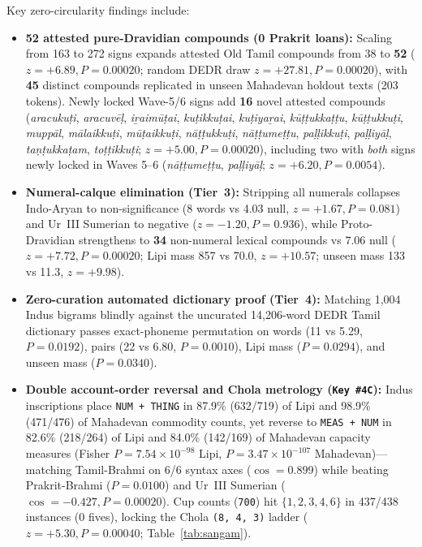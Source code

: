 \documentclass[11pt,a4paper]{article}
\begin{document}
Key zero-circularity findings include:
\begin{itemize}
  \item \textbf{52 attested pure-Dravidian compounds (0 Prakrit loans):} Scaling from 163 to 272 signs expands attested Old Tamil compounds from 38 to \textbf{52} ($z = +6.89, P = 0.00020$; random DEDR draw $z = +27.81, P = 0.00020$), with \textbf{45} distinct compounds replicated in unseen Mahadevan holdout texts (203 tokens). Newly locked Wave-5/6 signs add \textbf{16} novel attested compounds (\textit{aracukuṭi}, \textit{aracuvēḷ}, \textit{iṟaimūṭai}, \textit{kuṭikkuṭai}, \textit{kuṭiyaṟai}, \textit{kūṭṭukkaṭṭu}, \textit{kūṭṭukkuṭi}, \textit{muppāl}, \textit{mālaikkuṭi}, \textit{mūṭaikkuṭi}, \textit{nāṭṭukkuṭi}, \textit{nāṭṭumeṭṭu}, \textit{paḷḷikkuṭi}, \textit{paḷḷiyāḷ}, \textit{taṇṭukkaṭam}, \textit{toṭṭikkuṭi}; $z = +5.00, P = 0.00020$), including two with \textit{both} signs newly locked in Waves 5--6 (\textit{nāṭṭumeṭṭu}, \textit{paḷḷiyāḷ}; $z = +6.20, P = 0.0054$).
  \item \textbf{Numeral-calque elimination (Tier~3):} Stripping all numerals collapses Indo-Aryan to non-significance (8 words vs 4.03 null, $z = +1.67, P = 0.081$) and Ur~III Sumerian to negative ($z = -1.20, P = 0.936$), while Proto-Dravidian strengthens to \textbf{34} non-numeral lexical compounds vs 7.06 null ($z = +7.72, P = 0.00020$; Lipi mass 857 vs 70.0, $z = +10.57$; unseen mass 133 vs 11.3, $z = +9.98$).
  \item \textbf{Zero-curation automated dictionary proof (Tier~4):} Matching 1,004 Indus bigrams blindly against the uncurated 14,206-word DEDR Tamil dictionary passes exact-phoneme permutation on words (11 vs 5.29, $P = 0.0192$), pairs (22 vs 6.80, $P = 0.0010$), Lipi mass ($P = 0.0294$), and unseen mass ($P = 0.0340$).
  \item \textbf{Double account-order reversal and Chola metrology (\texttt{Key \#4C}):} Indus inscriptions place \texttt{NUM + THING} in 87.9\% (632/719) of Lipi and 98.9\% (471/476) of Mahadevan commodity counts, yet reverse to \texttt{MEAS + NUM} in 82.6\% (218/264) of Lipi and 84.0\% (142/169) of Mahadevan capacity measures (Fisher $P = 7.54 \times 10^{-98}$ Lipi, $P = 3.47 \times 10^{-107}$ Mahadevan)—matching Tamil-Brahmi on 6/6 syntax axes ($\cos = 0.899$) while beating Prakrit-Brahmi ($P = 0.0100$) and Ur~III Sumerian ($\cos = -0.427, P = 0.00020$). Cup counts (\texttt{700}) hit $\{1,2,3,4,6\}$ in 437/438 instances (0 fives), locking the Chola \texttt{(8, 4, 3)} ladder ($z = +5.30, P = 0.00040$; Table~\ref{tab:sangam}).
\end{itemize}
\end{document}
